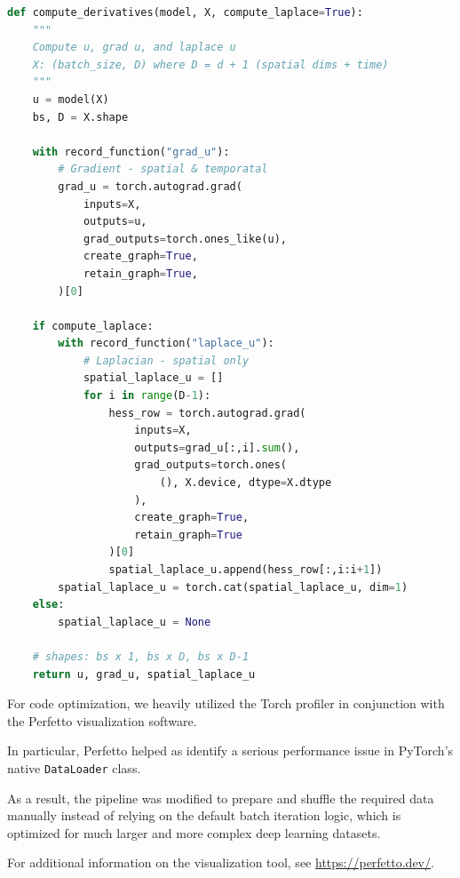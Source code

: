 \begin{lstlisting}[language=Python]
def compute_derivatives(model, X, compute_laplace=True):
    """
    Compute u, grad u, and laplace u
    X: (batch_size, D) where D = d + 1 (spatial dims + time)
    """
    u = model(X)
    bs, D = X.shape

    with record_function("grad_u"):
        # Gradient - spatial & temporatal
        grad_u = torch.autograd.grad(
            inputs=X,
            outputs=u,
            grad_outputs=torch.ones_like(u),
            create_graph=True,
            retain_graph=True,
        )[0]

    if compute_laplace: 
        with record_function("laplace_u"):
            # Laplacian - spatial only
            spatial_laplace_u = []
            for i in range(D-1):
                hess_row = torch.autograd.grad(
                    inputs=X,
                    outputs=grad_u[:,i].sum(),
                    grad_outputs=torch.ones(
                        (), X.device, dtype=X.dtype
                    ),
                    create_graph=True,
                    retain_graph=True
                )[0]
                spatial_laplace_u.append(hess_row[:,i:i+1])
        spatial_laplace_u = torch.cat(spatial_laplace_u, dim=1)
    else:
        spatial_laplace_u = None

    # shapes: bs x 1, bs x D, bs x D-1
    return u, grad_u, spatial_laplace_u
\end{lstlisting}


For code optimization, we heavily utilized the Torch profiler in conjunction with
the Perfetto visualization software.

In particular, Perfetto helped as identify a serious
performance issue in PyTorch's native \texttt{DataLoader} class.

As a result, the pipeline was modified to prepare and shuffle the required
data manually instead of relying on the default batch iteration logic,
which is optimized for much larger and more complex deep learning datasets.

For additional information on the visualization tool, see \url{https://perfetto.dev/}.

